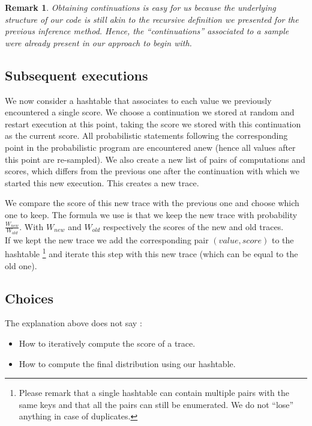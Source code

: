 \documentclass{article}
\newtheorem{remark}{Remark}
\begin{document}
	\begin{remark}
	  Obtaining continuations is easy for us because the underlying structure of our code is still akin to the recursive definition we presented for the previous inference method.
	  Hence, the ``continuations'' associated to a sample were already present in our approach to begin with.
	\end{remark}

	\subsection{Subsequent executions}

	We now consider a hashtable that associates to each value we previously encountered a single score. 
	We choose a continuation we stored at random and restart execution at this point, taking the score we stored with this continuation as the current score. 
	All probabilistic statements following the corresponding point in the probabilistic program are encountered anew (hence all values after this point are re-sampled).
	We also create a new list of pairs of computations and scores, which differs from the previous one after the continuation with which we started this new execution.
	This creates a new trace.

	We compare the score of this new trace with the previous one and choose which one to keep.
	The formula we use is that we keep the new trace with probability $\frac{W_{new}}{W_{old}}$. 
	With $W_{new}$ and $W_{old}$ respectively the scores of the new and old traces. \\

	If we kept the new trace we add the corresponding pair $(value, score)$ to the hashtable
	\footnote{Please remark that a single hashtable can contain multiple pairs with the same keys and that all the pairs can still be enumerated. We do not ``lose'' anything in case of duplicates.}
	and iterate this step with this new trace (which can be equal to the old one).

	\subsection{Choices}
	\label{subseq:choice}

	The explanation above does not say :
	\begin{itemize}
	  \item How to iteratively compute the score of a trace.
	  \item How to compute the final distribution using our hashtable.
	\end{itemize}
\end{document}
